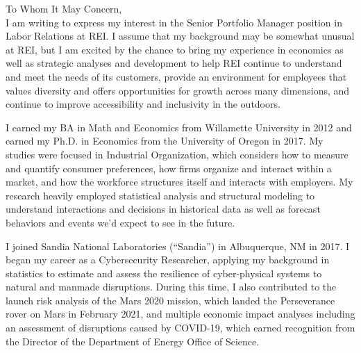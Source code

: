 \documentclass[10pt]{article}
\begin{document}
\noindent To Whom It May Concern,\\

I am writing to express my interest in the Senior Portfolio Manager position in Labor Relations at REI. I assume that my background may be somewhat unusual at REI, but I am excited by the chance to bring my experience in economics as well as strategic analyses and development to help REI continue to understand and meet the needs of its customers, provide an environment for employees that values diversity and offers opportunities for growth across many dimensions, and continue to improve accessibility and inclusivity in the outdoors. 

I earned my BA in Math and Economics from Willamette University in 2012 and earned my Ph.D. in Economics from the University of Oregon in 2017. My studies were focused in Industrial Organization, which considers how to measure and quantify consumer preferences, how firms organize and interact within a market, and how the workforce structures itself and interacts with employers. My research heavily employed statistical analysis and structural modeling to understand interactions and decisions in historical data as well as forecast behaviors and events we'd expect to see in the future.

I joined Sandia National Laboratories (``Sandia'') in Albuquerque, NM in 2017. I began my career as a Cybersecurity Researcher, applying my background in statistics to estimate and assess the resilience of cyber-physical systems to natural and manmade disruptions. During this time, I also contributed to the launch risk analysis of the Mars 2020 mission, which landed the Perseverance rover on Mars in February 2021, and multiple economic impact analyses including an assessment of disruptions caused by COVID-19, which earned recognition from the Director of the Department of Energy Office of Science.
\end{document}
